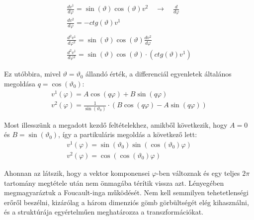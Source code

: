 \documentclass[a4paper,12pt]{article}
\begin{document}
\begin{gather*}
    \frac{dv^{1}}{d\varphi} = \sin(\vartheta)\cos(\vartheta)v^{2} \quad \rightarrow \quad \frac{d}{d\varphi} \\
    \frac{dv^{2}}{d\varphi} = -ctg(\vartheta)v^{1}  \\ \\
    \frac{d^{2}v^{1}}{d\varphi^{2}} = \sin(\vartheta)\cos(\vartheta)\frac{dv^{2}}{d\varphi} \\
    \frac{d^{2}v^{1}}{d\varphi^{2}} = \sin(\vartheta)\cos(\vartheta)\cdot(ctg(\vartheta)v^{1})
\end{gather*}
\par Ez utóbbira, mivel $\vartheta = \vartheta_{0}$ állandó érték, a differenciál egyenletek általános megoldása $q = \cos(\vartheta_{0})$:
\begin{align*}
    v^{1}(\varphi) = A\cos(q\varphi) + B\sin(q\varphi) \\
    v^{2}(\varphi) = \frac{1}{\sin(\vartheta_{0})}\cdot(B\cos(q\varphi) - A\sin(q\varphi))
\end{align*}
\par Most illesszünk a megadott kezdő feltételekhez, amikből következik, hogy $A = 0$ és $B = \sin(\vartheta_{0})$, így a partikuláris megoldás a következő lett:
\begin{align*}
    v^{1}(\varphi) = \sin(\vartheta_{0})\sin(\cos(\vartheta_{0})\varphi) \\
    v^{2}(\varphi) = \cos(\cos(\vartheta_{0})\varphi)
\end{align*}
\par Ahonnan az látszik, hogy a vektor komponensei $\varphi$-ben változnak és egy teljes $2\pi$ tartomány megtétele után nem önmagába térítik vissza azt. Lényegében megmagyaráztuk a Foucault-inga működését. Nem kell semmilyen tehetetlenségi erőről beszélni, kizárólag a három dimenziós gömb görbültségét elég kihasználni, és a struktúrája egyértelműen meghatározza a transzformációkat.
\end{document}
